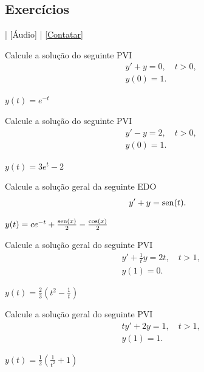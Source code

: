 \subsection*{Exercícios}

\begin{flushright}
  [Vídeo] | [Áudio] | \href{https://phkonzen.github.io/notas/contato.html}{[Contatar]}
\end{flushright}

\begin{exer}
  Calcule a solução do seguinte PVI
  \begin{align}
    &y' + y = 0, \quad t>0, \\
    &y(0) = 1.    
  \end{align}
\end{exer}
\begin{resp}
  $y(t) = e^{-t}$
\end{resp}

\begin{exer}
  Calcule a solução do seguinte PVI
  \begin{align}
    &y' - y = 2, \quad t>0, \\
    &y(0) = 1.    
  \end{align}
\end{exer}
\begin{resp}
  $y(t) = 3e^{t}-2$
\end{resp}

\begin{exer}
  Calcule a solução geral da seguinte EDO
  \begin{equation}
    y' + y = \operatorname{sen}(t).
  \end{equation}
\end{exer}
\begin{resp}
  $y(t) = ce^{-t} + \frac{\operatorname{sen}(x)}{2} - \frac{\cos(x)}{2}$
\end{resp}

\begin{exer}
  Calcule a solução geral do seguinte PVI
  \begin{align}
    &y' + \frac{1}{t}y = 2t,\quad t>1,\\
    &y(1) = 0.
  \end{align}
\end{exer}
\begin{resp}
  $y(t) = \frac{2}{3}\left(t^2 - \frac{1}{t}\right)$
\end{resp}

\begin{exer}
  Calcule a solução geral do seguinte PVI
  \begin{align}
    &ty' + 2y = 1,\quad t>1,\\
    &y(1) = 1.
  \end{align}
\end{exer}
\begin{resp}
  $y(t) = \frac{1}{2}\left(\frac{1}{t^2} + 1\right)$
\end{resp}

